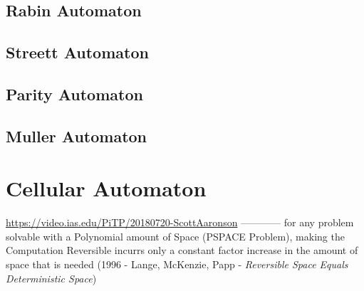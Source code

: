 \subsection{Rabin Automaton}\label{sec:rabin_automaton}

\subsection{Streett Automaton}\label{sec:streett_automaton}

\subsection{Parity Automaton}\label{sec:parity_automaton}

\subsection{Muller Automaton}\label{sec:muller_automaton}



\section{Cellular Automaton}\label{sec:cellular_automaton}

\url{https://video.ias.edu/PiTP/20180720-ScottAaronson} ------------
for any problem solvable with a Polynomial amount of Space (PSPACE Problem),
making the Computation Reversible incurrs only a constant factor increase in the
amount of space that is needed (1996 - Lange, McKenzie, Papp - \emph{Reversible
  Space Equals Deterministic Space})



